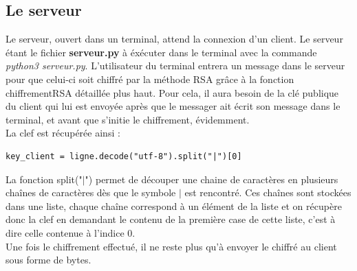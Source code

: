 \documentclass[12pt]{article}
\theoremstyle{definition}
\begin{document}
	\subsection{Le serveur}
	Le serveur, ouvert dans un terminal, attend la connexion d'un client. Le serveur étant le fichier \textbf{serveur.py} à éxécuter dans le terminal avec la commande \textit{python3 serveur.py}.
L'utilisateur du terminal entrera un message dans le serveur pour que celui-ci soit chiffré par la méthode RSA grâce à la fonction \textsf{chiffrementRSA} détaillée plus haut. Pour cela, il aura besoin de la clé publique du client qui lui est envoyée après que le messager ait écrit son message dans le terminal, et avant que s'initie le chiffrement, évidemment. \\
La clef est récupérée ainsi :
\begin{verbatim}
key_client = ligne.decode("utf-8").split("|")[0]
\end{verbatim}
La fonction split("$\mid $") permet de découper une chaine de caractères en plusieurs chaînes de caractères dès que le symbole $\mid$ est rencontré. Ces chaînes sont stockées dans une liste, chaque chaîne correspond à un élément de la liste et on récupère donc la clef en demandant le contenu de la première case de cette liste, c'est à dire celle contenue à l'indice $0$.\\
Une fois le chiffrement effectué, il ne reste plus qu'à envoyer le chiffré au client sous forme de bytes. 
\end{document}
